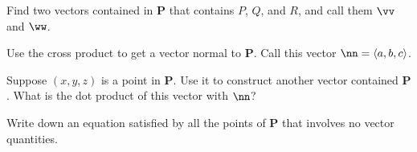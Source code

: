 \documentclass[12pt]{exam}
\begin{document}
\begin{questions}
\question Find two vectors contained in $\mathbf{P}$ that contains $P$, $Q$,
and $R$, and call them $\vv$ and $\ww$.

\question Use the cross product to get a vector normal to $\mathbf{P}$. Call
this vector $\nn = \langle a, b, c \rangle$.

\question Suppose $(x, y, z)$ is a point in $\mathbf{P}$. Use it to construct
another vector contained $\mathbf{P}$. What is the dot product of this vector
with $\nn$?

\question Write down an equation satisfied by all the points of $\mathbf{P}$
that involves no vector quantities.

\end{questions} 
\end{document}
